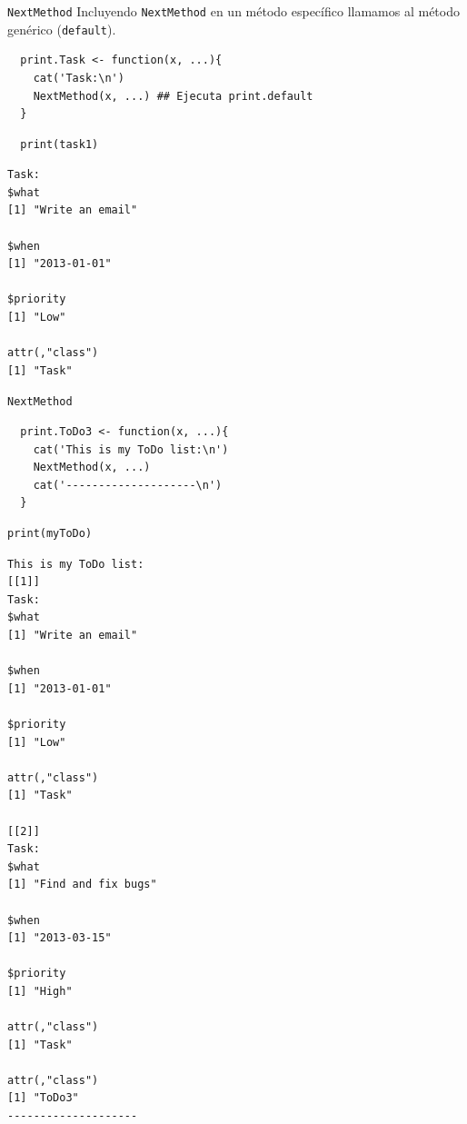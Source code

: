 \documentclass[xcolor={usenames,svgnames,dvipsnames}]{beamer}
\begin{document}
\begin{frame}[label={sec:org6435cda},fragile]{\texttt{NextMethod}}
 Incluyendo \texttt{NextMethod} en un método específico llamamos al método genérico (\texttt{default}).
\lstset{language=r,label= ,caption= ,captionpos=b,numbers=none}
\begin{lstlisting}
  print.Task <- function(x, ...){
    cat('Task:\n')
    NextMethod(x, ...) ## Ejecuta print.default
  }
\end{lstlisting}

\lstset{language=r,label= ,caption= ,captionpos=b,numbers=none}
\begin{lstlisting}
  print(task1)
\end{lstlisting}

\begin{verbatim}
Task:
$what
[1] "Write an email"

$when
[1] "2013-01-01"

$priority
[1] "Low"

attr(,"class")
[1] "Task"
\end{verbatim}
\end{frame}

\begin{frame}[label={sec:org38e02a6},fragile]{\texttt{NextMethod}}
 \lstset{language=r,label= ,caption= ,captionpos=b,numbers=none}
\begin{lstlisting}
  print.ToDo3 <- function(x, ...){
    cat('This is my ToDo list:\n')
    NextMethod(x, ...)
    cat('--------------------\n')
  }
\end{lstlisting}

\lstset{language=r,label= ,caption= ,captionpos=b,numbers=none}
\begin{lstlisting}
print(myToDo)
\end{lstlisting}

\begin{verbatim}
This is my ToDo list:
[[1]]
Task:
$what
[1] "Write an email"

$when
[1] "2013-01-01"

$priority
[1] "Low"

attr(,"class")
[1] "Task"

[[2]]
Task:
$what
[1] "Find and fix bugs"

$when
[1] "2013-03-15"

$priority
[1] "High"

attr(,"class")
[1] "Task"

attr(,"class")
[1] "ToDo3"
--------------------
\end{verbatim}
\end{frame}
\end{document}
